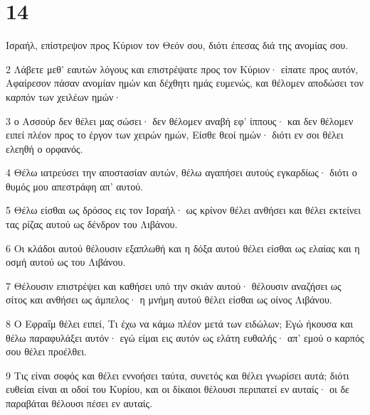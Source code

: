\chapter{14}

\par Ισραήλ, επίστρεψον προς Κύριον τον Θεόν σου, διότι έπεσας διά της ανομίας σου.
\par 2 Λάβετε μεθ' εαυτών λόγους και επιστρέψατε προς τον Κύριον· είπατε προς αυτόν, Αφαίρεσον πάσαν ανομίαν ημών και δέχθητι ημάς ευμενώς, και θέλομεν αποδώσει τον καρπόν των χειλέων ημών·
\par 3 ο Ασσούρ δεν θέλει μας σώσει· δεν θέλομεν αναβή εφ' ίππους· και δεν θέλομεν ειπεί πλέον προς το έργον των χειρών ημών, Είσθε θεοί ημών· διότι εν σοι θέλει ελεηθή ο ορφανός.
\par 4 Θέλω ιατρεύσει την αποστασίαν αυτών, θέλω αγαπήσει αυτούς εγκαρδίως· διότι ο θυμός μου απεστράφη απ' αυτού.
\par 5 Θέλω είσθαι ως δρόσος εις τον Ισραήλ· ως κρίνον θέλει ανθήσει και θέλει εκτείνει τας ρίζας αυτού ως δένδρον του Λιβάνου.
\par 6 Οι κλάδοι αυτού θέλουσιν εξαπλωθή και η δόξα αυτού θέλει είσθαι ως ελαίας και η οσμή αυτού ως του Λιβάνου.
\par 7 Θέλουσιν επιστρέψει και καθήσει υπό την σκιάν αυτού· θέλουσιν αναζήσει ως σίτος και ανθήσει ως άμπελος· η μνήμη αυτού θέλει είσθαι ως οίνος Λιβάνου.
\par 8 Ο Εφραΐμ θέλει ειπεί, Τι έχω να κάμω πλέον μετά των ειδώλων; Εγώ ήκουσα και θέλω παραφυλάξει αυτόν· εγώ είμαι εις αυτόν ως ελάτη ευθαλής· απ' εμού ο καρπός σου θέλει προέλθει.
\par 9 Τις είναι σοφός και θέλει εννοήσει ταύτα, συνετός και θέλει γνωρίσει αυτά; διότι ευθείαι είναι αι οδοί του Κυρίου, και οι δίκαιοι θέλουσι περιπατεί εν αυταίς· οι δε παραβάται θέλουσι πέσει εν αυταίς.


